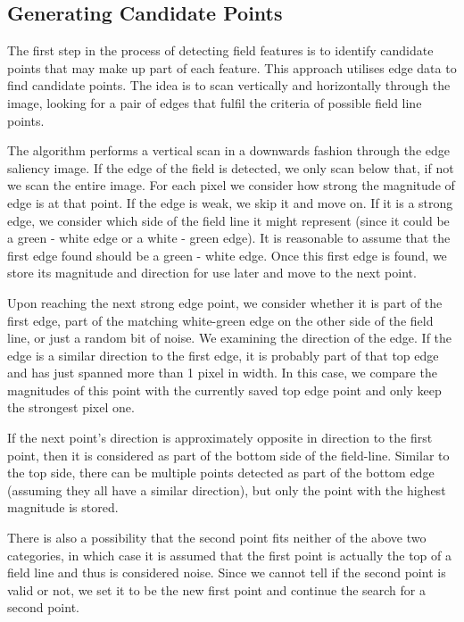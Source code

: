 \documentclass{article}
\begin{document}
\subsection{Generating Candidate Points}
The first step in the process of detecting field features is to identify candidate points that may make up part of each feature. This approach utilises edge data to find candidate points. The idea is to scan vertically and horizontally through the image, looking for a pair of edges that fulfil the criteria of possible field line points.

The algorithm performs a vertical scan in a downwards fashion through the edge saliency image. If the edge of the field is detected, we only scan below that, if not we scan the entire image. For each pixel we consider how strong the magnitude of edge is at that point. If the edge is weak, we skip it and move on. If it is a strong edge, we consider which side of the field line it might represent (since it could be a green - white edge or a white - green edge). It is reasonable to assume that the first edge found should be a green - white edge. Once this first edge is found, we store its magnitude and direction for use later and move to the next point.

Upon reaching the next strong edge point, we consider whether it is part of the first edge, part of the matching white-green edge on the other side of the field line, or just a random bit of noise. We examining the direction of the edge. If the edge is a similar direction to the first edge, it is probably part of that top edge and has just spanned more than 1 pixel in width. In this case, we compare the magnitudes of this point with the currently saved top edge point and only keep the strongest pixel one.

If the next point's direction is approximately opposite in direction to the first point, then it is considered as part of the bottom side of the field-line. Similar to the top side, there can be multiple points detected as part of the bottom edge (assuming they all have a similar direction), but only the point with the highest magnitude is stored.

There is also a possibility that the second point fits neither of the above two categories, in which case it is assumed that the first point is actually the top of a field line and thus is considered noise. Since we cannot tell if the second point is valid or not, we set it to be the new first point and continue the search for a second point.
\end{document}

